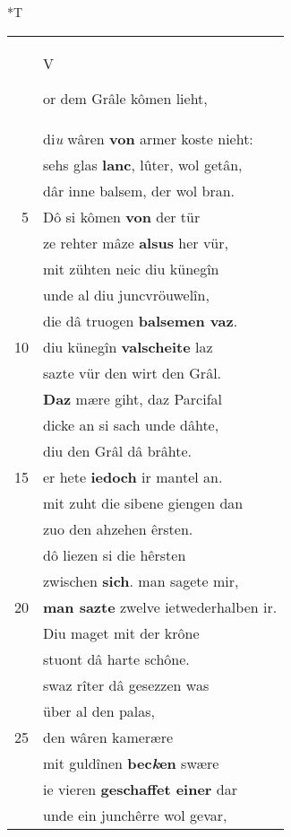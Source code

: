 \documentclass[8pt,a4paper,notitlepage]{article}
\begin{document}
\begin{table}[ht]
\hspace{0.5cm}
\begin{minipage}[t]{0.5\linewidth}
\small
\begin{center}*T
\end{center}
\begin{tabular}{rl}
 & \begin{large}V\end{large}or dem Grâle kômen lieht,\\ 
 & di\textit{u} wâren \textbf{von} armer koste nieht:\\ 
 & sehs glas \textbf{lanc}, lûter, wol getân,\\ 
 & dâr inne balsem, der wol bran.\\ 
5 & Dô si kômen \textbf{von} der tür\\ 
 & ze rehter mâze \textbf{alsus} her vür,\\ 
 & mit zühten neic diu künegîn\\ 
 & unde al diu juncvröuwelîn,\\ 
 & die dâ truogen \textbf{balsemen vaz}.\\ 
10 & diu künegîn \textbf{valscheite} laz\\ 
 & sazte vür den wirt den Grâl.\\ 
 & \textbf{Daz} mære giht, daz Parcifal\\ 
 & dicke an si sach unde dâhte,\\ 
 & diu den Grâl dâ brâhte.\\ 
15 & er hete \textbf{iedoch} ir mantel an.\\ 
 & mit zuht die sibene giengen dan\\ 
 & zuo den ahzehen êrsten.\\ 
 & dô liezen si die hêrsten\\ 
 & zwischen \textbf{sich}. man sagete mir,\\ 
20 & \textbf{man sazte} zwelve ietwederhalben ir.\\ 
 & Diu maget mit der krône\\ 
 & stuont dâ harte schône.\\ 
 & swaz rîter dâ gesezzen was\\ 
 & über al den palas,\\ 
25 & den wâren kamerære\\ 
 & mit guldînen \textbf{bec\textit{k}en} swære\\ 
 & ie vieren \textbf{geschaffet einer} dar\\ 
 & unde ein junchêrre wol gevar,\\ 

\end{tabular}
\end{minipage}
\end{table}
\end{document}
